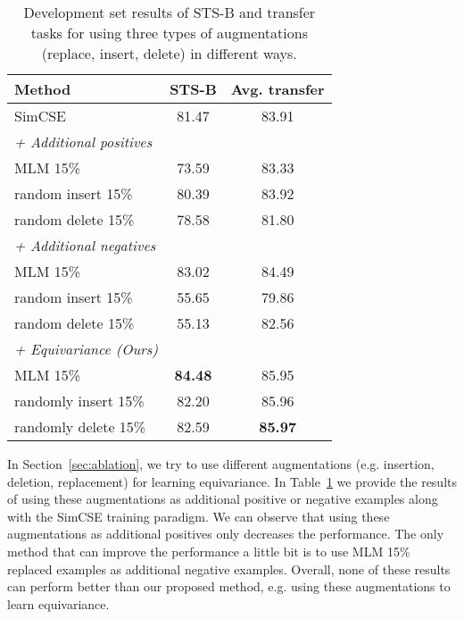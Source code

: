 \documentclass[11pt]{article}
\begin{document}
\label{sec:extrapos}
\begin{table}[t]
\centering
\small
\setlength\tabcolsep{3pt}
\begin{tabular}{lcc}

\toprule
\bf Method                 & \bf STS-B & \multicolumn{1}{c}{\bf Avg. transfer} \\
\midrule
SimCSE                     & 81.47 & 83.91                                    \\
\midrule
\it + Additional positives & \multicolumn{1}{l}{}                     \\
\midrule
MLM 15\%                   & 73.59 & 83.33                                    \\
random insert 15\%         & 80.39 & 83.92                                    \\
random delete 15\%         & 78.58 & 81.80                                    \\
\midrule
\it + Additional negatives & \multicolumn{1}{l}{}                     \\
\midrule
MLM 15\%                   & 83.02 & 84.49                                    \\
random insert 15\%         & 55.65 & 79.86                                    \\
random delete 15\%         & 55.13 & 82.56                                    \\
\midrule
\multicolumn{2}{l}{\it + Equivariance (Ours)   }                     \\
\midrule

MLM 15\%                   & \bf 84.48 & 85.95                                    \\
randomly insert 15\%         & 82.20 & 85.96                                    \\
randomly delete 15\%         & 82.59 & \bf 85.97                                    \\
\bottomrule

\end{tabular}
\caption{Development set results of STS-B and transfer tasks for using three types of augmentations (replace, insert, delete) in different ways.}
\label{tab:compare_aug}
\end{table}
 In Section~\ref{sec:ablation}, we try to use different augmentations (e.g. insertion, deletion, replacement) for learning equivariance. In Table~\ref{tab:compare_aug} we provide the results of using these augmentations as additional positive or negative examples along with the SimCSE training paradigm. We can observe that using these augmentations as additional positives only decreases the performance. The only method that can improve the performance a little bit is to use MLM 15\% replaced examples as additional negative examples. Overall, none of these results can perform better than our proposed method, e.g. using these augmentations to learn equivariance.
\end{document}
